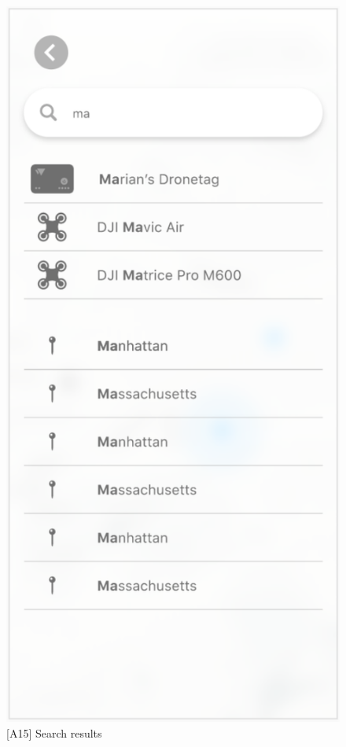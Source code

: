 \begin{figure}
\begin{minipage}{.45\textwidth}
        \centering
        \includegraphics[width=.7\linewidth]{assets/user_interface_design/search/search_results.png}
        \caption{[A15] Search results}
        \label{fig:search_results}
    \end{minipage}
    \label{fig:search_all}
\end{figure}

